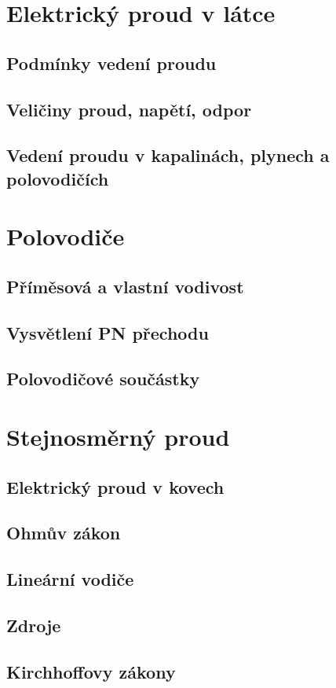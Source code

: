 \documentclass[titlepage]{book}
\begin{document}
\chapter{Elektrický proud v látce}
\section{Podmínky vedení proudu}
\section{Veličiny proud, napětí, odpor}
\section{Vedení proudu v kapalinách, plynech a polovodičích}
\chapter{Polovodiče}
\section{Příměsová a vlastní vodivost}
\section{Vysvětlení PN přechodu}
\section{Polovodičové součástky}
\chapter{Stejnosměrný proud}
\section{Elektrický proud v kovech}
\section{Ohmův zákon}
\section{Lineární vodiče}
\section{Zdroje}
\section{Kirchhoffovy zákony}
\end{document}

